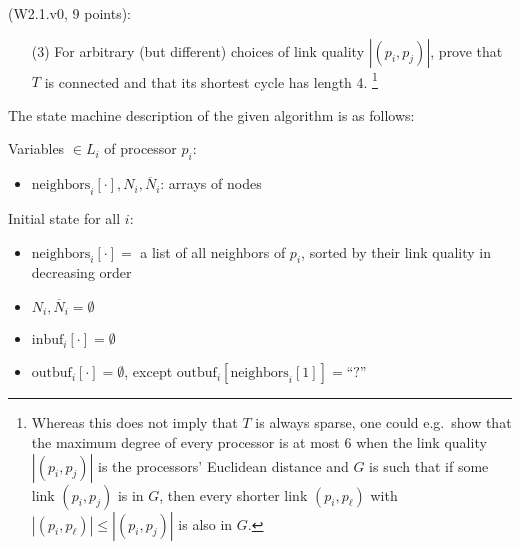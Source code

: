 \begin{Exc}{(W2.1.v0, 9 points):}
\begin{enumerate}
\item[(3)] For arbitrary (but different) choices of link quality
$|(p_i,p_j)|$, prove that $T$ is connected and that its shortest
cycle has length 4.
\footnote{Whereas this does not imply that $T$ is always sparse,
one could e.g.\ show that the maximum degree of every processor is at
most 6 when the link quality $|(p_i,p_j)|$ is the processors' Euclidean
distance and $G$ is such that if some link $(p_i,p_j)$ is
in $G$, then every shorter link $(p_i,p_\ell)$ with $|(p_i,p_\ell)|
\leq |(p_i,p_j)|$ is also in $G$.}
\end{enumerate}
\end{Exc}


The state machine description of the given algorithm is as follows:

Variables $\in L_i$ of processor $p_i$:
\begin{itemize}
\item $\text{neighbors}_i[\cdot], N_i, \overline{N}_i$: arrays of nodes
\end{itemize}

Initial state for all $i$:
\begin{itemize}
\item $\text{neighbors}_i[\cdot] = $ a list of all neighbors of $p_i$, sorted by their
      link quality in decreasing order
\item $N_i, \overline{N}_i = \emptyset$
\item $\text{inbuf}_i[\cdot] = \emptyset$
\item $\text{outbuf}_i[\cdot] = \emptyset$, except $\text{outbuf}_i[\text{neighbors}_i[1]] = \text{``?''}$
\end{itemize}


